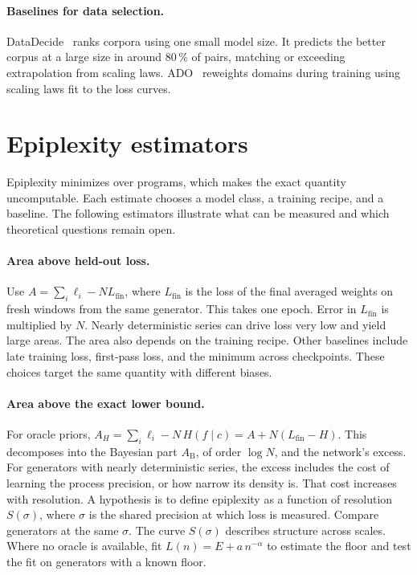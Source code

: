 \documentclass[11pt]{article}
\newcommand{\Lfin}{L_{\mathrm{fin}}}
\begin{document}
\paragraph{Baselines for data selection.} DataDecide~\citep{magnusson2025} ranks
corpora using one small model size. It predicts the better corpus at a large size
in around 80\,\% of pairs, matching or exceeding extrapolation from scaling laws.
ADO~\citep{jiang2025} reweights domains during training using scaling laws fit to
the loss curves.

\section{Epiplexity estimators}\label{sec:estimators}

Epiplexity minimizes over programs, which makes the exact quantity uncomputable.
Each estimate chooses a model class, a training recipe, and a baseline. The
following estimators illustrate what can be measured and which theoretical
questions remain open.

\paragraph{Area above held-out loss.} Use $A=\sum_i\ell_i-N\Lfin$, where
$\Lfin$ is the loss of the final averaged weights on fresh windows from the
same generator. This takes one epoch. Error in $\Lfin$ is multiplied by $N$.
Nearly deterministic series can drive loss very low and yield large areas.
The area also depends on the training recipe. Other baselines include late
training loss, first-pass loss, and the minimum across checkpoints. These
choices target the same quantity with different biases.

\paragraph{Area above the exact lower bound.} For oracle priors,
$A_H=\sum_i\ell_i-N\,H(f\mid c)=A+N(\Lfin-H)$. This decomposes into the
Bayesian part $A_{\mathrm{B}}$, of order $\log N$, and the network's excess.
For generators with nearly deterministic series, the excess includes the
cost of learning the process precision, or how narrow its density is.
That cost increases with resolution. A hypothesis is to define epiplexity
as a function of resolution $S(\sigma)$, where $\sigma$ is the shared
precision at which loss is measured. Compare generators at the same $\sigma$.
The curve $S(\sigma)$ describes structure across scales. Where no oracle
is available, fit $L(n)=E+a\,n^{-\alpha}$ to estimate the floor and test
the fit on generators with a known floor.
\end{document}
